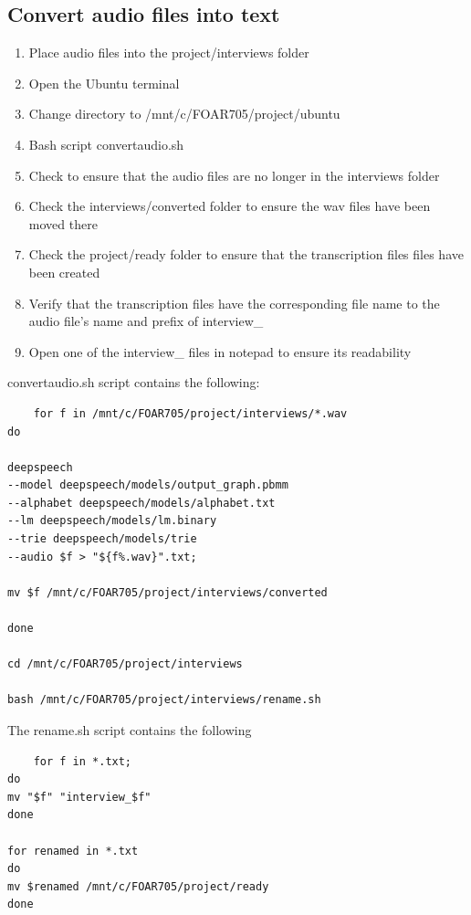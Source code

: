 \documentclass{article}
\begin{document}
\subsection{Convert audio files into text}
\begin{enumerate}
    \item Place audio files into the project/interviews folder
    \item Open the Ubuntu terminal
    \item Change directory to /mnt/c/FOAR705/project/ubuntu
    \item Bash script convertaudio.sh
    \item Check to ensure that the audio files are no longer in the interviews folder
    \item Check the interviews/converted folder to ensure the wav files have been moved there
    \item Check the project/ready folder to ensure that the transcription files files have been created
    \item Verify that the transcription files have the corresponding file name to the audio file's name and prefix of interview\_
    \item Open one of the interview\_ files in notepad to ensure its readability
\end{enumerate}
convertaudio.sh script contains the following:
\begin{verbatim}
    for f in /mnt/c/FOAR705/project/interviews/*.wav
do

deepspeech 
--model deepspeech/models/output_graph.pbmm 
--alphabet deepspeech/models/alphabet.txt 
--lm deepspeech/models/lm.binary 
--trie deepspeech/models/trie 
--audio $f > "${f%.wav}".txt;

mv $f /mnt/c/FOAR705/project/interviews/converted

done

cd /mnt/c/FOAR705/project/interviews

bash /mnt/c/FOAR705/project/interviews/rename.sh
\end{verbatim}
The rename.sh script contains the following
\begin{verbatim}
    for f in *.txt;
do
mv "$f" "interview_$f"
done

for renamed in *.txt
do
mv $renamed /mnt/c/FOAR705/project/ready
done

\end{verbatim}
\end{document}
